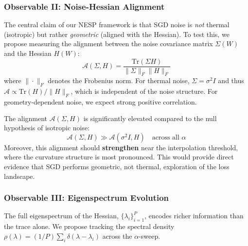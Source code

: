\subsubsection{Observable II: Noise-Hessian Alignment}

The central claim of our NESP framework is that SGD noise is \textit{not} thermal (isotropic) but rather \textit{geometric} (aligned with the Hessian). To test this, we propose measuring the alignment between the noise covariance matrix $\Sigma(W)$ and the Hessian $H(W)$:
\begin{equation}
    \mathcal{A}(\Sigma, H) = \frac{\mathrm{Tr}(\Sigma H)}{\|\Sigma\|_F \|H\|_F}
\end{equation}
where $\|\cdot\|_F$ denotes the Frobenius norm. For thermal noise, $\Sigma = \sigma^2 I$ and thus $\mathcal{A} \propto \mathrm{Tr}(H)/\|H\|_F$, which is independent of the noise structure. For geometry-dependent noise, we expect strong positive correlation.

\begin{hypothesis}
The alignment $\mathcal{A}(\Sigma, H)$ is significantly elevated compared to the null hypothesis of isotropic noise:
\begin{equation}
    \mathcal{A}(\Sigma, H) \gg \mathcal{A}(\sigma^2 I, H) \quad \text{across all } \alpha
\end{equation}
Moreover, this alignment should \textbf{strengthen} near the interpolation threshold, where the curvature structure is most pronounced. This would provide direct evidence that SGD performs geometric, not thermal, exploration of the loss landscape.
\end{hypothesis}

\subsubsection{Observable III: Eigenspectrum Evolution}

The full eigenspectrum of the Hessian, $\{\lambda_i\}_{i=1}^P$, encodes richer information than the trace alone. We propose tracking the spectral density $\rho(\lambda) = (1/P)\sum_i \delta(\lambda - \lambda_i)$ across the $\alpha$-sweep.

